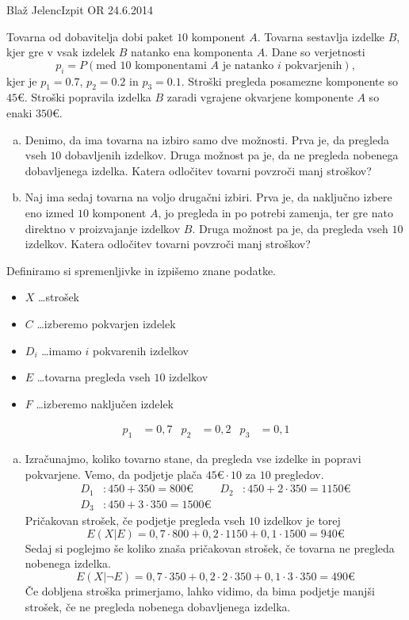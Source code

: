 \begin{naloga}{Blaž Jelenc}{Izpit OR 24.6.2014}
\begin{vprasanje}
Tovarna od dobavitelja dobi paket $10$ komponent $A$.
Tovarna sestavlja izdelke $B$,
kjer gre v vsak izdelek $B$ natanko ena komponenta $A$.
Dane so verjetnosti
$$
p_i = P(\text{med $10$ komponentami $A$ je natanko $i$ pokvarjenih}),
$$
kjer je $p_1 = 0.7$, $p_2 = 0.2$ in $p_3 = 0.1$.
Stroški pregleda posamezne komponente so $45 €$.
Stroški popravila izdelka $B$ zaradi vgrajene okvarjene komponente $A$
so enaki $350 €$.
\begin{enumerate}[(a)]
\item Denimo, da ima tovarna na izbiro samo dve možnosti.
Prva je, da pregleda vseh $10$ dobavljenih izdelkov.
Druga možnost pa je, da ne pregleda nobenega dobavljenega izdelka.
Katera odločitev tovarni povzroči manj stroškov?

\item Naj ima sedaj tovarna na voljo drugačni izbiri.
Prva je, da naključno izbere eno izmed $10$ komponent $A$,
jo pregleda in po potrebi zamenja,
ter gre nato direktno v proizvajanje izdelkov $B$.
Druga možnost pa je, da pregleda vseh $10$ izdelkov.
Katera odločitev tovarni povzroči manj stroškov?
\end{enumerate}
\end{vprasanje}
\begin{odgovor}
Definiramo si spremenljivke in izpišemo znane podatke.
\begin{itemize}
\item[] $X$ \dots strošek
\item[] $C$ \dots izberemo pokvarjen izdelek
\item[] $D_i$ \dots imamo $i$ pokvarenih izdelkov
\item[] $E$ \dots tovarna pregleda vseh $10$ izdelkov
\item[] $F$ \dots izberemo naključen izdelek
\end{itemize}
\begin{align*}
p_1 &= 0,7 & p_2 &= 0,2 & p_3 &= 0,1
\end{align*}

\begin{enumerate}[(a)]
\item Izračunajmo, koliko tovarno stane, da pregleda vse izdelke in popravi pokvarjene. Vemo, da podjetje plača $45 € \cdot 10$ za $10$ pregledov.
\begin{align*}
D_1 &: 450 + 350 = 800 €&
D_2&: 450 + 2 \cdot 350 = 1150 €\\
D_3&: 450 + 3 \cdot 350 = 1500 €
\end{align*}
Pričakovan strošek, če podjetje pregleda vseh $10$ izdelkov je torej
$$
E(X|E) = 0,7 \cdot 800 + 0,2 \cdot 1150 + 0,1 \cdot 1500 = 940 €
$$
Sedaj si poglejmo še koliko znaša pričakovan strošek, če tovarna ne pregleda nobenega izdelka. 
$$
E(X|\neg E) = 0,7 \cdot 350 + 0,2 \cdot 2 \cdot 350 + 0,1 \cdot 3 \cdot 350 = 490 €
$$
Če dobljena stroška primerjamo, lahko vidimo, da bima podjetje manjši strošek, če ne pregleda nobenega dobavljenega izdelka.


\end{enumerate}
\end{odgovor}
\end{naloga}
